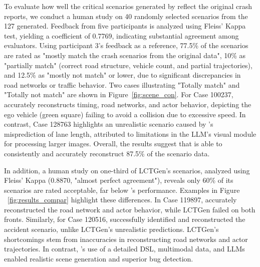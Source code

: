 To evaluate how well the critical scenarios generated by {\tool} reflect the original crash reports, we conduct a human study on 40 randomly selected scenarios from the 127 generated. Feedback from five participants is analyzed using Fleiss' Kappa test, yielding a coefficient of 0.7769, indicating substantial agreement among evaluators. Using participant 3's feedback as a reference, 77.5\% of the scenarios are rated as "mostly match the crash scenarios from the original data", 10\% as "partially match" (correct road structure, vehicle count, and partial trajectories), and 12.5\% as "mostly not match" or lower, due to significant discrepancies in road networks or traffic behavior. Two cases illustrating "Totally match" and "Totally not match" are shown in Figure~\ref{fig:scene_con}. For Case 100237, {\tool} accurately reconstructs timing, road networks, and actor behavior, depicting the ego vehicle (green square) failing to avoid a collision due to excessive speed. In contrast, Case 128763 highlights an unrealistic scenario caused by {\tool}'s misprediction of lane length, attributed to limitations in the LLM's visual module for processing larger images. Overall, the results suggest that {\tool} is able to consistently and accurately reconstruct 87.5\% of the scenario data.

In addition, a human study on one-third of LCTGen’s scenarios, analyzed using Fleiss' Kappa (0.8870, "almost perfect agreement"), reveals only 60\% of its scenarios are rated acceptable, far below {\tool}’s performance. Examples in Figure ~\ref{fig:results_compar} highlight these differences. In Case 119897, {\tool} accurately reconstructed the road network and actor behavior, while LCTGen failed on both fronts. Similarly, for Case 120516, {\tool} successfully identified and reconstructed the accident scenario, unlike LCTGen’s unrealistic predictions. LCTGen's shortcomings stem from inaccuracies in reconstructing road networks and actor trajectories. In contrast, {\tool}'s use of a detailed DSL, multimodal data, and LLMs enabled realistic scene generation and superior bug detection.



